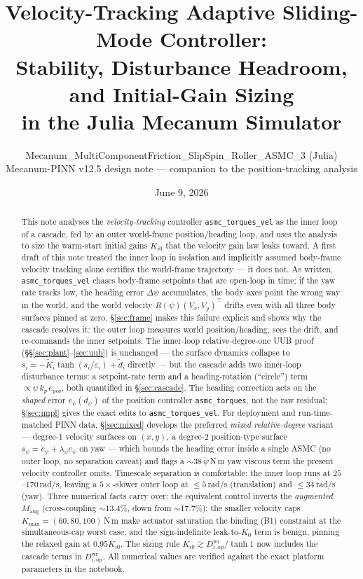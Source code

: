 \documentclass[11pt]{article}
\title{\bfseries Velocity-Tracking Adaptive Sliding-Mode Controller:\\
Stability, Disturbance Headroom, and Initial-Gain Sizing\\
in the Julia Mecanum Simulator}
\author{\normalsize Mecanum\_MultiComponentFriction\_SlipSpin\_Roller\_ASMC\_3 (Julia)\\
\normalsize Mecanum-PINN v12.5 design note --- companion to the position-tracking analysis}
\date{June 9, 2026}
\theoremstyle{plain}
\theoremstyle{definition}
\newcommand{\Vx}{V_x}
\newcommand{\Vy}{V_y}
\newcommand{\Maug}{M_{\mathrm{aug}}}
\newcommand{\Dwr}{D^{\mathrm{wr}}}
\newcommand{\Kmax}{K_{\max}}
\newcommand{\Tr}[1]{\tanh\!\left(#1\right)}
\begin{document}
\maketitle

\begin{abstract}
This note analyses the \emph{velocity-tracking} controller \texttt{asmc\_torques\_vel}
as the inner loop of a cascade, fed by an outer world-frame position/heading loop, and
uses the analysis to size the warm-start initial gains $K_{i0}$ that the velocity gain
law leaks toward. A first draft of this note treated the inner loop in isolation and
implicitly assumed body-frame velocity tracking alone certifies the world-frame
trajectory --- it does not. As written, \texttt{asmc\_torques\_vel} chases body-frame
setpoints that are open-loop in time; if the yaw rate tracks low, the heading error
$\Delta\psi$ accumulates, the body axes point the wrong way in the world, and the
world velocity $R(\psi)(\Vx,\Vy)^\top$ drifts even with all three body surfaces pinned
at zero. \S\ref{sec:frame} makes this failure explicit and shows why the cascade
resolves it: the outer loop measures world position/heading, sees the drift, and
re-commands the inner setpoints. The inner-loop relative-degree-one UUB proof
(\S\S\ref{sec:plant}--\ref{sec:uub}) is unchanged --- the surface dynamics collapse to
$\dot s_i=-\tilde K_i\Tr{s_i/\varepsilon_i}+\tilde d_i$ directly --- but the cascade
adds two inner-loop disturbance terms: a setpoint-rate term and a heading-rotation
(``circle'') term $\propto\dot\psi\,k_p\,e_{\mathrm{pos}}$, both quantified in
\S\ref{sec:cascade}. The heading correction acts on the \emph{shaped} error
$e_\psi(d_\psi)$ of the position controller \texttt{asmc\_torques}, not the raw
residual; \S\ref{sec:impl} gives the exact edits to \texttt{asmc\_torques\_vel}.
For deployment and run-time-matched PINN data, \S\ref{sec:mixed} develops the preferred
\emph{mixed relative-degree} variant --- degree-1 velocity surfaces on $(x,y)$, a
degree-2 position-type surface $s_\psi=\dot e_\psi+\lambda_\psi e_\psi$ on yaw --- which
bounds the heading error inside a single ASMC (no outer loop, no separation caveat) and
flags a $\sim38\,\dot\psi\,$N\,m yaw viscous term the present velocity controller omits. Timescale separation is comfortable: the inner loop runs at
$25$--$170\,$rad/s, leaving a $5\times$-slower outer loop at $\le5\,$rad/s
(translation) and $\le34\,$rad/s (yaw). Three numerical facts carry over: the
equivalent control inverts the \emph{augmented} $\Maug$ (cross-coupling
${\sim}13.4\%$, down from ${\sim}17.7\%$); the smaller velocity caps
$\Kmax=(60,80,100)\,$N\,m make actuator saturation the binding (B1) constraint at the
simultaneous-cap worst case; and the sign-indefinite leak-to-$K_0$ term is benign,
pinning the relaxed gain at $0.95K_{i0}$. The sizing rule
$K_{i0}\gtrsim\Dwr_{i,\mathrm{op}}/\tanh1$ now includes the cascade terms in
$\Dwr_{i,\mathrm{op}}$. All numerical values are verified against the exact platform
parameters in the notebook.
\end{abstract}
\end{document}
